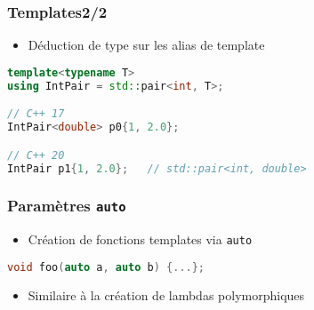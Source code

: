 \documentclass[C++.tex]{subfiles}
\begin{document}
\begin{frame}[fragile]
	\frametitle{Templates\titlehfill{}2/2}
	\begin{itemize}
		\item Déduction de type sur les alias de template
	\end{itemize}
		
	\begin{lstlisting}[language=C++]
template<typename T>
using IntPair = std::pair<int, T>;

// C++ 17
IntPair<double> p0{1, 2.0}; 

// C++ 20
IntPair p1{1, 2.0};   // std::pair<int, double>\end{lstlisting}
\end{frame}

\begin{frame}[fragile]
	\frametitle{Paramètres \lstinline|auto|}
	\begin{itemize}
		\item Création de fonctions templates via \lstinline|auto|
	\end{itemize}

	\begin{lstlisting}[language=C++]
void foo(auto a, auto b) {...};\end{lstlisting}

	\begin{itemize}
		\item Similaire	à la création de lambdas polymorphiques
	\end{itemize}
\end{frame}
\end{document}
